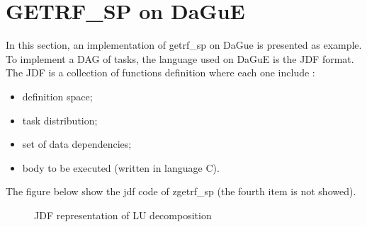 \documentclass{report}
\begin{document}
\section{GETRF\_SP on DaGuE}
In this section, an implementation of getrf\_sp on DaGue is presented as example. To implement a DAG of tasks, the language used on DaGuE is the JDF format. The JDF is a collection of functions definition where each one include :
\begin{itemize}
\item definition space;
\item task distribution;
\item set of data dependencies;
\item body to be executed (written in language C).
\end{itemize}
The figure below show the jdf code of zgetrf\_sp (the fourth item is not showed).
\begin{figure}[!h]
{\scriptsize} 
\caption{JDF representation of LU decomposition}
\end{figure}
\end{document}
